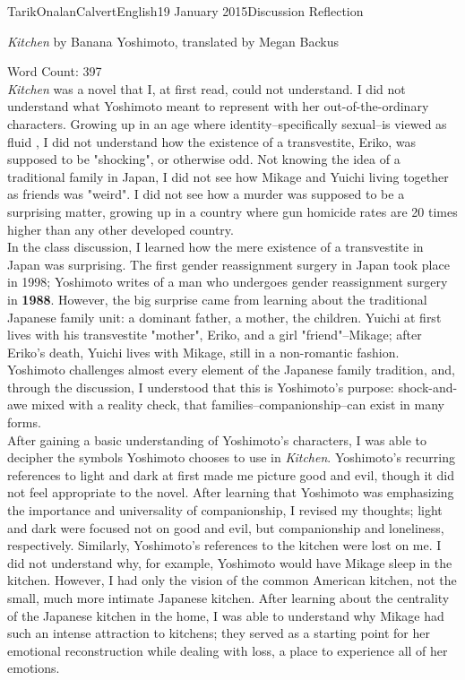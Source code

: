 \documentclass[12pt,a4paper]{article}
\begin{document}
    \begin{mla}{Tarik}{Onalan}{Calvert}{English}{19 January 2015}{Discussion Reflection}
        \centerline{\textit{Kitchen} by Banana Yoshimoto, translated by Megan Backus}
        \noindent{}Word Count: 397 \\
        \textit{Kitchen} was a novel that I, at first read, could not understand. I did
        not understand what Yoshimoto meant to represent with her out-of-the-ordinary
        characters. Growing up in an age where identity--specifically sexual--is viewed
        as fluid , I did not understand how the existence of a transvestite, Eriko,
        was supposed to be "shocking", or otherwise odd. Not knowing the idea of a traditional
        family in Japan, I did not see how Mikage and Yuichi living together as friends
        was "weird". I did not see how a murder was supposed to be a surprising matter,
        growing up in a country where gun homicide rates are 20 times higher than any
        other developed country. \\
        In the class discussion, I learned how the mere existence of a transvestite in
        Japan was surprising. The first gender reassignment surgery in Japan took place
        in 1998; Yoshimoto writes of a man who undergoes gender reassignment surgery
        in \textbf{1988}. However, the big surprise came from learning
        about the traditional Japanese family unit: a dominant father, a mother, the
        children. Yuichi at first lives with his transvestite "mother", Eriko, and a
        girl "friend"--Mikage; after Eriko's death, Yuichi lives with Mikage, still in
        a non-romantic fashion. Yoshimoto challenges almost every element of the Japanese
        family tradition, and, through the discussion, I understood that this is Yoshimoto's
        purpose: shock-and-awe mixed with a reality check, that families--companionship--can
        exist in many forms. \\
        After gaining a basic understanding of Yoshimoto's characters, I was able to decipher
        the symbols Yoshimoto chooses to use in \textit{Kitchen}. Yoshimoto's recurring
        references to light and dark at first made me picture good and evil, though
        it did not feel appropriate to the novel. After learning that Yoshimoto was
        emphasizing the importance and universality of companionship, I revised my thoughts;
        light and dark were focused not on good and evil, but companionship and loneliness,
        respectively. Similarly, Yoshimoto's references to the kitchen were lost on me.
        I did not understand why, for example, Yoshimoto would have Mikage sleep in the kitchen.
        However, I had only the vision of the common American kitchen, not the small, much more
        intimate Japanese kitchen. After learning about the centrality of the Japanese
        kitchen in the home, I was able to understand why Mikage had such an intense attraction
        to kitchens; they served as a starting point for her emotional reconstruction while
        dealing with loss, a place to experience all of her emotions.
    \end{mla}
\end{document}

